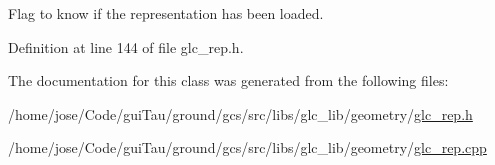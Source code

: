 Flag to know if the representation has been loaded. 



Definition at line 144 of file glc\-\_\-rep.\-h.



The documentation for this class was generated from the following files\-:\begin{DoxyCompactItemize}
\item 
/home/jose/\-Code/gui\-Tau/ground/gcs/src/libs/glc\-\_\-lib/geometry/\hyperlink{glc__rep_8h}{glc\-\_\-rep.\-h}\item 
/home/jose/\-Code/gui\-Tau/ground/gcs/src/libs/glc\-\_\-lib/geometry/\hyperlink{glc__rep_8cpp}{glc\-\_\-rep.\-cpp}\end{DoxyCompactItemize}
